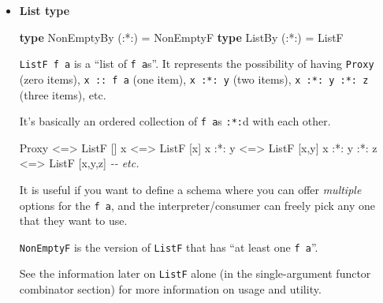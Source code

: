 \documentclass[]{article}
\newenvironment{Shaded}{}{}
\newcommand{\CommentTok}[1]{\textcolor[rgb]{0.38,0.63,0.69}{\textit{#1}}}
\newcommand{\DataTypeTok}[1]{\textcolor[rgb]{0.56,0.13,0.00}{#1}}
\newcommand{\KeywordTok}[1]{\textcolor[rgb]{0.00,0.44,0.13}{\textbf{#1}}}
\newcommand{\NormalTok}[1]{#1}
\newcommand{\OperatorTok}[1]{\textcolor[rgb]{0.40,0.40,0.40}{#1}}
\newcommand{\OtherTok}[1]{\textcolor[rgb]{0.00,0.44,0.13}{#1}}
\renewcommand{\href}[2]{#2\footnote{\url{#1}}}
\begin{document}
\begin{itemize}
  It is used to combine the results in both branches of the \texttt{:*:}.

  To introduce an ``empty'' branch, we need \texttt{Plus} (in
  \emph{\href{https://hackage.haskell.org/package/semigroupoids/docs/Data-Functor-Plus.html}{Data.Functor.Plus}}),
  which is like a higher-kinded \texttt{Monoid}, or \texttt{Alternative} with no
  \texttt{Applicative}:

\begin{Shaded}
\begin{Highlighting}[]
\KeywordTok{class} \DataTypeTok{Alt}\NormalTok{ f }\OtherTok{=>} \DataTypeTok{Plus}\NormalTok{ f }\KeywordTok{where}
\OtherTok{    zero ::}\NormalTok{ f a}
\end{Highlighting}
\end{Shaded}
\item
  \textbf{List type}

\begin{Shaded}
\begin{Highlighting}[]
\KeywordTok{type} \DataTypeTok{NonEmptyBy}\NormalTok{ (}\OperatorTok{:*:}\NormalTok{) }\OtherTok{=} \DataTypeTok{NonEmptyF}
\KeywordTok{type} \DataTypeTok{ListBy}\NormalTok{     (}\OperatorTok{:*:}\NormalTok{) }\OtherTok{=} \DataTypeTok{ListF}
\end{Highlighting}
\end{Shaded}

  \texttt{ListF\ f\ a} is a ``list of \texttt{f\ a}s''. It represents the
  possibility of having \texttt{Proxy} (zero items), \texttt{x\ ::\ f\ a} (one
  item), \texttt{x\ :*:\ y} (two items), \texttt{x\ :*:\ y\ :*:\ z} (three
  items), etc.

  It's basically an ordered collection of \texttt{f\ a}s \texttt{:*:}d with each
  other.

\begin{Shaded}
\begin{Highlighting}[]
\DataTypeTok{Proxy}         \OperatorTok{<=>} \DataTypeTok{ListF}\NormalTok{ []}
\NormalTok{x             }\OperatorTok{<=>} \DataTypeTok{ListF}\NormalTok{ [x]}
\NormalTok{x }\OperatorTok{:*:}\NormalTok{ y       }\OperatorTok{<=>} \DataTypeTok{ListF}\NormalTok{ [x,y]}
\NormalTok{x }\OperatorTok{:*:}\NormalTok{ y }\OperatorTok{:*:}\NormalTok{ z }\OperatorTok{<=>} \DataTypeTok{ListF}\NormalTok{ [x,y,z]}
\CommentTok{{-}{-} etc.}
\end{Highlighting}
\end{Shaded}

  It is useful if you want to define a schema where you can offer
  \emph{multiple} options for the \texttt{f\ a}, and the interpreter/consumer
  can freely pick any one that they want to use.

  \texttt{NonEmptyF} is the version of \texttt{ListF} that has ``at least one
  \texttt{f\ a}''.

  See the information later on \texttt{ListF} alone (in the single-argument
  functor combinator section) for more information on usage and utility.
\end{itemize}
\end{document}
